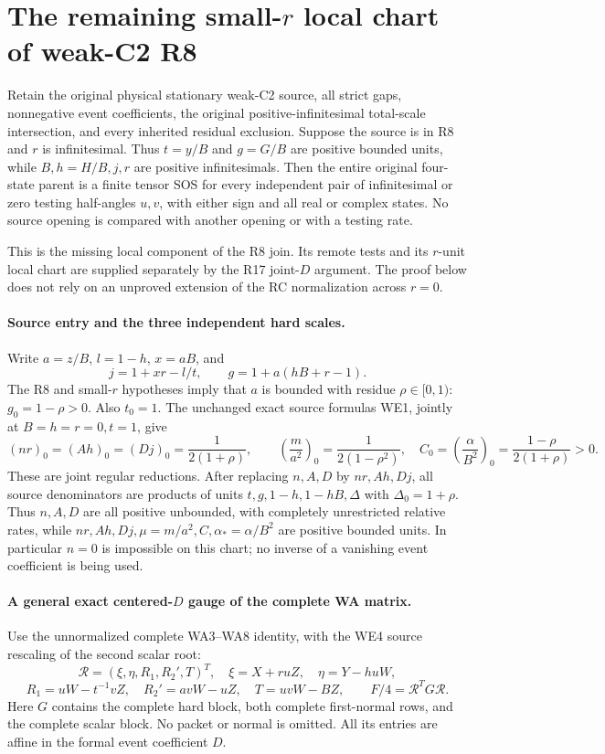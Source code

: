 \section{The remaining small-$r$ local chart of weak-C2 R8}
\label{sec:r17-r8-small-r}

\begin{theorem}
Retain the original physical stationary weak-C2 source, all strict gaps,
nonnegative event coefficients, the original positive-infinitesimal
total-scale intersection, and every inherited residual exclusion.
Suppose the source is in R8 and $r$ is infinitesimal. Thus $t=y/B$
and $g=G/B$ are positive bounded units, while $B,h=H/B,j,r$ are
positive infinitesimals. Then the entire original four-state parent is
a finite tensor SOS for every independent pair of infinitesimal or zero
testing half-angles $u,v$, with either sign and all real or complex states.
No source opening is compared with another opening or with a testing rate.
\end{theorem}

This is the missing local component of the R8 join. Its remote tests
and its $r$-unit local chart are supplied separately by the R17
joint-$D$ argument. The proof below does not rely on an unproved
extension of the RC normalization across $r=0$.

\paragraph{Source entry and the three independent hard scales.}
Write $a=z/B$, $l=1-h$, $x=aB$, and
\[
 j=1+xr-l/t,\qquad g=1+a(hB+r-1).
\]
The R8 and small-$r$ hypotheses imply that $a$ is bounded with residue
$\rho\in[0,1)$: $g_0=1-\rho>0$. Also $t_0=1$.
The unchanged exact source formulas WE1, jointly at $B=h=r=0,t=1$,
give
\[
 (nr)_0=(Ah)_0=(Dj)_0=\frac1{2(1+\rho)},\qquad
 \left(\frac{m}{a^2}\right)_0=\frac1{2(1-\rho^2)},
 \quad C_0=\left(\frac\alpha{B^2}\right)_0
       =\frac{1-\rho}{2(1+\rho)}>0.                 \tag{RD1}
\]
These are joint regular reductions. After replacing $n,A,D$ by
$nr,Ah,Dj$, all source denominators are products of units
$t,g,1-h,1-hB,\Delta$ with $\Delta_0=1+\rho$.
Thus $n,A,D$ are all positive unbounded, with completely unrestricted
relative rates, while $nr,Ah,Dj,\mu=m/a^2,C,\alpha_*=\alpha/B^2$
are positive bounded units. In particular $n=0$ is impossible on
this chart; no inverse of a vanishing event coefficient is being used.

\paragraph{A general exact centered-$D$ gauge of the complete WA matrix.}
Use the unnormalized complete WA3--WA8 identity, with the WE4 source
rescaling of the second scalar root:
\[
 \mathcal R=(\xi,\eta,R_1,R_2',T)^T,
 \quad \xi=X+ruZ,\quad\eta=Y-huW,
\]
\[
 R_1=uW-t^{-1}vZ,\quad R_2'=avW-uZ,\quad T=uvW-BZ,
 \qquad F/4=\mathcal R^TG\mathcal R.                \tag{RD2}
\]
Here $G$ contains the complete hard block, both complete first-normal
rows, and the complete scalar block. No packet or normal is omitted.
All its entries are affine in the formal event coefficient $D$.

